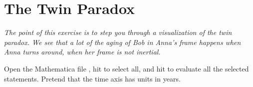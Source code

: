\section{The Twin Paradox}

\makelabheader %

\bigskip

\textit{The point of this exercise is to step you through a visualization of the twin paradox.  We see that a lot of the aging of Bob in Anna's frame happens when Anna turns around, when her frame is not inertial.}

Open the Mathematica file , hit  to select all, and hit  to evaluate all the selected statements.  Pretend that the time axis has units in years.

